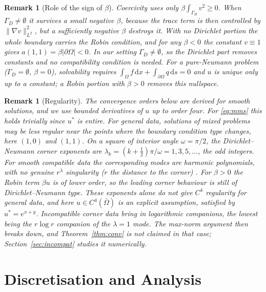 \documentclass[11pt,a4paper]{article}
\theoremstyle{palplain}
\theoremstyle{paldef}
\theoremstyle{palremark}
\newtheorem{remark}[theorem]{Remark}
\newcommand{\GD}{\Gamma_D}
\newcommand{\GB}{\Gamma_B}
\newcommand{\dd}{\,\mathrm{d}}
\begin{document}
\begin{remark}[Role of the sign of $\beta$]\label{rem:beta}
Coercivity uses only $\beta\int_{\GB}v^2\ge0$. When $\GD\neq\emptyset$ it survives a small
negative $\beta$, because the trace term is then controlled by $\|\nabla v\|^2_{L^2}$, but a
sufficiently negative $\beta$ destroys it. With no Dirichlet portion the whole boundary carries
the Robin condition, and for any $\beta<0$ the constant $v\equiv1$ gives
$a(1,1)=\beta|\partial\Omega|<0$. In our setting $\GD\neq\emptyset$, so the Dirichlet part
removes constants and no compatibility condition is needed. For a pure-Neumann problem ($\GD=\emptyset$, $\beta=0$), solvability
requires $\int_\Omega f\dd x+\int_{\partial\Omega}q\dd s=0$ and $u$ is unique only up to a
constant; a Robin portion with $\beta>0$ removes this nullspace.
\end{remark}

\begin{remark}[Regularity]
The convergence orders below are derived for smooth solutions, and we use bounded
derivatives of $u$ up to order four. For \eqref{eq:mms} this holds trivially since $u^*$ is
entire. For general data, solutions of mixed problems may be less regular near the points
where the boundary condition type changes, here $(1,0)$ and $(1,1)$. On a square of interior
angle $\omega=\pi/2$, the Dirichlet--Neumann corner exponents are
$\lambda_k=(k+\tfrac12)\pi/\omega=1,3,5,\dots$, the odd integers. For smooth compatible data
the corresponding modes are harmonic polynomials, with no genuine $r^\lambda$ singularity
($r$ the distance to the corner)
\cite{grisvard}. For $\beta>0$ the Robin term $\beta u$ is of lower order, so the leading
corner behaviour is still of Dirichlet--Neumann type. These exponents alone do not give
$C^4$ regularity for general data, and here $u\in C^4(\bar\Omega)$ is an explicit assumption,
satisfied by $u^*=e^{x+y}$. Incompatible corner data bring in logarithmic companions, the
lowest being the $r\log r$ companion of the $\lambda=1$ mode. The max-norm argument then
breaks down, and Theorem~\ref{thm:conv} is not claimed in that case; Section~\ref{sec:incompat}
studies it numerically.
\end{remark}

\section{Discretisation and Analysis}\label{sec:disc}
\end{document}
